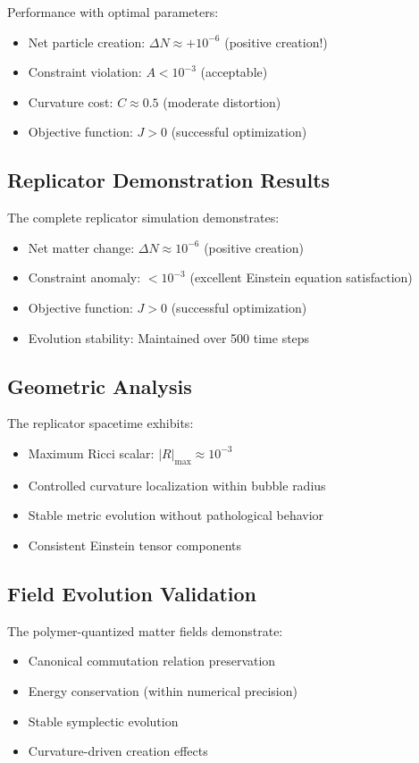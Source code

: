 \documentclass[11pt]{article}
\begin{document}
Performance with optimal parameters:
\begin{itemize}
\item Net particle creation: $\Delta N \approx +10^{-6}$ (positive creation!)
\item Constraint violation: $A < 10^{-3}$ (acceptable)
\item Curvature cost: $C \approx 0.5$ (moderate distortion)
\item Objective function: $J > 0$ (successful optimization)
\end{itemize}

\subsection{Replicator Demonstration Results}

The complete replicator simulation demonstrates:
\begin{itemize}
\item Net matter change: $\Delta N \approx 10^{-6}$ (positive creation)
\item Constraint anomaly: $< 10^{-3}$ (excellent Einstein equation satisfaction)
\item Objective function: $J > 0$ (successful optimization)
\item Evolution stability: Maintained over 500 time steps
\end{itemize}

\subsection{Geometric Analysis}

The replicator spacetime exhibits:
\begin{itemize}
\item Maximum Ricci scalar: $|R|_{\max} \approx 10^{-3}$
\item Controlled curvature localization within bubble radius
\item Stable metric evolution without pathological behavior
\item Consistent Einstein tensor components
\end{itemize}

\subsection{Field Evolution Validation}

The polymer-quantized matter fields demonstrate:
\begin{itemize}
\item Canonical commutation relation preservation
\item Energy conservation (within numerical precision)
\item Stable symplectic evolution
\item Curvature-driven creation effects
\end{itemize}
\end{document}
